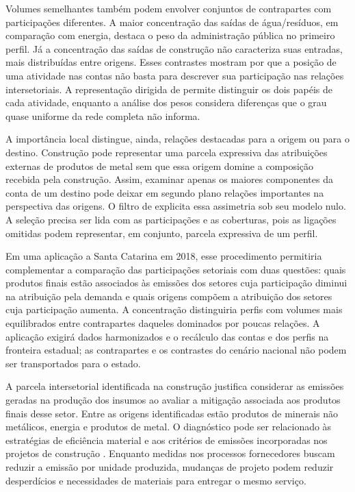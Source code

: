 \documentclass[11pt]{article}
\begin{document}
Volumes semelhantes também podem envolver conjuntos de contrapartes com participações diferentes. A maior concentração das saídas de água/resíduos, em comparação com energia, destaca o peso da administração pública no primeiro perfil. Já a concentração das saídas de construção não caracteriza suas entradas, mais distribuídas entre origens. Esses contrastes mostram por que a posição de uma atividade nas contas não basta para descrever sua participação nas relações intersetoriais. A representação dirigida de \textcite{huang2019} permite distinguir os dois papéis de cada atividade, enquanto a análise dos pesos considera diferenças que o grau quase uniforme da rede completa não informa.

A importância local distingue, ainda, relações destacadas para a origem ou para o destino. Construção pode representar uma parcela expressiva das atribuições externas de produtos de metal sem que essa origem domine a composição recebida pela construção. Assim, examinar apenas os maiores componentes da conta de um destino pode deixar em segundo plano relações importantes na perspectiva das origens. O filtro de \textcite{serrano2009} explicita essa assimetria sob seu modelo nulo. A seleção precisa ser lida com as participações e as coberturas, pois as ligações omitidas podem representar, em conjunto, parcela expressiva de um perfil.

Em uma aplicação a Santa Catarina em 2018, esse procedimento permitiria complementar a comparação das participações setoriais com duas questões: quais produtos finais estão associados às emissões dos setores cuja participação diminui na atribuição pela demanda e quais origens compõem a atribuição dos setores cuja participação aumenta. A concentração distinguiria perfis com volumes mais equilibrados entre contrapartes daqueles dominados por poucas relações. A aplicação exigirá dados harmonizados e o recálculo das contas e dos perfis na fronteira estadual; as contrapartes e os contrastes do cenário nacional não podem ser transportados para o estado.

A parcela intersetorial identificada na construção justifica considerar as emissões geradas na produção dos insumos ao avaliar a mitigação associada aos produtos finais desse setor. Entre as origens identificadas estão produtos de minerais não metálicos, energia e produtos de metal. O diagnóstico pode ser relacionado às estratégias de eficiência material e aos critérios de emissões incorporadas nos projetos de construção \parencite[seções~5.1 e~6.4]{rissman2020}. Enquanto medidas nos processos fornecedores buscam reduzir a emissão por unidade produzida, mudanças de projeto podem reduzir desperdícios e necessidades de materiais para entregar o mesmo serviço.
\end{document}
